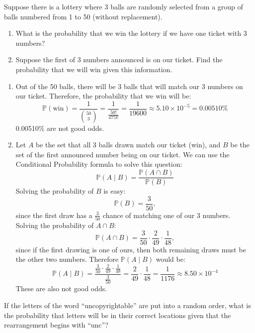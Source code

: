\documentclass{jhwhw}
\begin{document}
    \problem{}
        Suppose there is a lottery where 3 balls are randomly selected from a group of balls numbered
from 1 to 50 (without replacement).
        \begin{enumerate}
            \item What is the probability that we win the lottery if we have one ticket with 3 numbers?
            \item Suppose the first of 3 numbers announced is on our ticket. Find the probability that we
will win given this information.
        \end{enumerate}
    \solution
        \begin{enumerate}
            \item Out of the 50 balls, there will be 3 balls that will match our 3 numbers on our ticket. Therefore,
            the probability that we win will be:
            \[
                \mathbb{P}(\text{win}) = \frac{1}{\binom{50}{3}} = \frac{1}{\frac{50!}{47!3!}} = \frac{1}{19600} \approx 5.10 \times  10^{-5} = 0.00510\% 
            \]
            0.00510\% are not good odds.
            \item Let \(A\) be the set that all 3 balls drawn match our ticket (win), and \(B\) be the set of the first announced
            number being on our ticket. We can use the Conditional Probability formula to solve this question:
            \[
                \mathbb{P}(A \mid B) = \frac{\mathbb{P}(A \cap B)}{\mathbb{P}(B)}
            \]
            Solving the probability of \(B\) is easy:
            \[
                \mathbb{P}(B) = \frac{3}{50},
            \] 
            since the first draw has a \(\frac{3}{50}\) chance of matching one of our 3 numbers. Solving the probability of \(A \cap  B\):
            \[
                \mathbb{P}(A \cap  B) = \frac{3}{50} \cdot \frac{2}{49} \cdot \frac{1}{48},
            \]
            since if the first drawing is one of ours, then both remaining draws must be the other two numbers. Therefore \(\mathbb{P}(A \mid B)\) would be:
            \[
                \mathbb{P}(A \mid B) = \frac{\frac{3}{50} \cdot \frac{2}{49} \cdot \frac{1}{48}}{\frac{3}{50}} = \frac{2}{49} \cdot \frac{1}{48} = \frac{1}{1176}
                \approx 8.50 \times 10^{-4} 
            \]
            These are also not good odds.
        \end{enumerate}

    \problem{}
        If the letters of the word “uncopyrightable” are put into a random order, what is the probability
that letters will be in their correct locations given that the rearrangement begins with “unc”?
\end{document}
